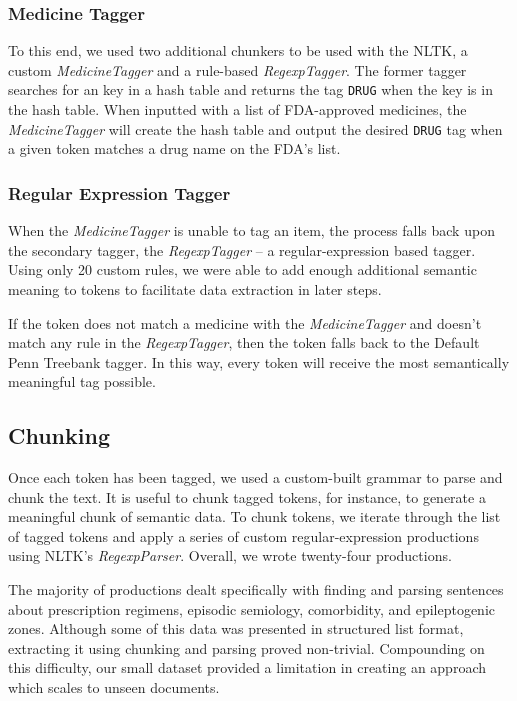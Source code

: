 \documentclass{acm_proc_article-sp}
\begin{document}
\subsubsection{Medicine Tagger}
To this end, we used two additional chunkers to be used with the NLTK, a custom \textit{MedicineTagger} and
a rule-based \textit{RegexpTagger}. The former tagger searches for an key in a hash table and returns the tag
\texttt{DRUG} when the key is in the hash table. When inputted with a list of FDA-approved medicines, the
\textit{MedicineTagger} will create the hash table and output the desired \texttt{DRUG} tag when a given token
matches a drug name on the FDA's list.

\subsubsection{Regular Expression Tagger}
When the \textit{MedicineTagger} is unable to tag an item, the process falls back upon the secondary tagger, the
\textit{RegexpTagger} -- a regular-expression based tagger. Using only 20 custom rules, we were able to add enough
additional semantic meaning to tokens to facilitate data extraction in later steps.

If the token does not match a medicine with the \textit{MedicineTagger} and doesn't match any rule in the
\textit{RegexpTagger}, then the token falls back to the Default Penn Treebank tagger. In this way, every token will
receive the most semantically meaningful tag possible.

\subsection{Chunking}
Once each token has been tagged, we used a custom-built grammar to parse and chunk
the text. It is useful to chunk tagged tokens, for instance, to generate a meaningful chunk of
semantic data. To chunk tokens, we iterate through the list of tagged tokens and apply a series
of custom regular-expression productions using NLTK's \textit{RegexpParser}. Overall, we wrote
twenty-four productions.

The majority of productions dealt specifically with finding and parsing
sentences about prescription regimens, episodic semiology, comorbidity, and epileptogenic
zones. Although some of this data was presented in structured list format, extracting it using
chunking and parsing proved non-trivial. Compounding on this difficulty, our 
small dataset provided a limitation in creating an approach which scales to unseen documents.
\end{document}
